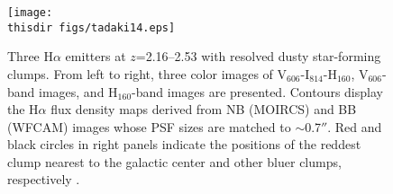 \begin{figure}%
\centerline{
\texttt{[image: \\thisdir figs/tadaki14.eps]}
}
\caption{
Three H$\alpha$ emitters at $z$=2.16--2.53 with resolved dusty
 star-forming clumps. From left to right, three color images of
 V$_{606}$-I$_{814}$-H$_{160}$, V$_{606}$-band images, and
 H$_{160}$-band images are presented. Contours display the H$\alpha$
 flux density maps derived from NB (MOIRCS) and BB (WFCAM) images whose
 PSF sizes are matched to $\sim$0.7$''$. Red and black circles in right
 panels indicate the positions of the reddest clump nearest to the
 galactic center and other bluer clumps, respectively 
 \citep{tadaki14}.
}
\label{fig:}
\end{figure}








%
